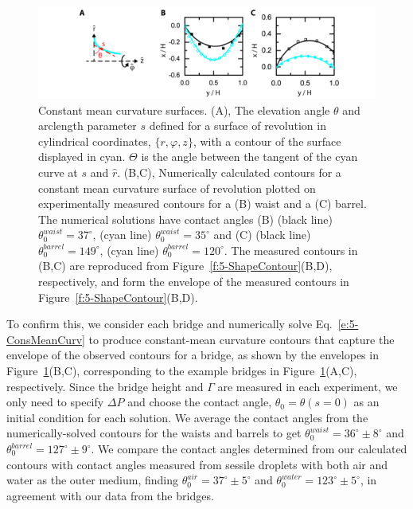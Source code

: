 \begin{figure}
  \centering
  \includegraphics{figures/C5/Ch5-Figs_ShapeEnvelope.png}
  \caption{Constant mean curvature surfaces.
  (A), The elevation angle $\theta$ and arclength parameter $s$ defined for a surface of revolution in cylindrical coordinates, $\{r,\varphi, z\}$, with a contour of the surface displayed in cyan.
  $\Theta$ is the angle between the tangent of the cyan curve at $s$ and $\hat{r}$.
  (B,C), Numerically calculated contours for a constant mean curvature surface of revolution plotted on experimentally measured contours for a (B) waist and a (C) barrel.
  The numerical solutions have contact angles (B) (black line) $\theta_0^{waist} = 37^{\circ}$, (cyan line) $\theta_0^{waist} = 35^{\circ}$ and (C) (black line) $\theta_0^{barrel} = 149^{\circ}$, (cyan line) $\theta_0^{barrel} = 120^{\circ}$.
  The measured contours in (B,C) are reproduced from Figure~\ref{f:5-ShapeContour}(B,D), respectively, and form the envelope of the measured contours in Figure~\ref{f:5-ShapeContour}(B,D).}\label{f:5-ShapeEnvelope}
\end{figure}

To confirm this, we consider each bridge and numerically solve Eq.~\ref{e:5-ConsMeanCurv} to produce constant-mean curvature contours that capture the envelope of the observed contours for a bridge, as shown by the envelopes in Figure~\ref{f:5-ShapeEnvelope}(B,C), corresponding to the example bridges in Figure~\ref{f:5-ShapeEnvelope}(A,C), respectively.
Since the bridge height and $\Gamma$ are measured in each experiment, we only need to specify $\Delta P$ and choose the contact angle, $\theta_0 = \theta(s=0)$ as an initial condition for each solution.
We average the contact angles from the numerically-solved contours for the waists and barrels to get $\theta^{waist}_0 = 36^{\circ} \pm 8^{\circ}$ and $\theta^{barrel}_0 = 127^{\circ} \pm 9^{\circ}$.
We compare the contact angles determined from our calculated contours with contact angles measured from sessile droplets with both air and water as the outer medium, finding $\theta_0^{air} = 37^{\circ} \pm 5^{\circ}$ and $\theta_0^{water} = 123^{\circ} \pm 5^{\circ}$, in agreement with our data from the bridges.




